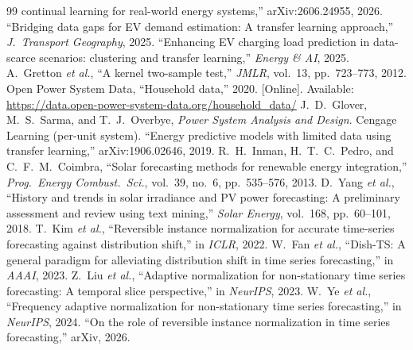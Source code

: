 \documentclass[conference]{IEEEtran}
\begin{document}
\begin{thebibliography}{99}
continual learning for real-world energy systems,'' arXiv:2606.24955, 2026.
 ``Bridging data gaps for EV demand estimation: A
transfer learning approach,'' \emph{J.\ Transport Geography}, 2025.
 ``Enhancing EV charging load prediction in
data-scarce scenarios: clustering and transfer learning,'' \emph{Energy \& AI},
2025.
 A.~Gretton \emph{et al.}, ``A kernel two-sample test,''
\emph{JMLR}, vol.~13, pp.~723--773, 2012.
 Open Power System Data, ``Household data,'' 2020. [Online].
Available: \url{https://data.open-power-system-data.org/household_data/}
 J.~D.~Glover, M.~S.~Sarma, and T.~J.~Overbye, \emph{Power System
Analysis and Design}. Cengage Learning (per-unit system).
 ``Energy predictive models with limited data using transfer
learning,'' arXiv:1906.02646, 2019.
 R.~H.~Inman, H.~T.~C.~Pedro, and C.~F.~M.~Coimbra, ``Solar
forecasting methods for renewable energy integration,'' \emph{Prog.\ Energy
Combust.\ Sci.}, vol.~39, no.~6, pp.~535--576, 2013.
 D.~Yang \emph{et al.}, ``History and trends in solar irradiance
and PV power forecasting: A preliminary assessment and review using text mining,''
\emph{Solar Energy}, vol.~168, pp.~60--101, 2018.
 T.~Kim \emph{et al.}, ``Reversible instance normalization for
accurate time-series forecasting against distribution shift,'' in \emph{ICLR}, 2022.
 W.~Fan \emph{et al.}, ``Dish-TS: A general paradigm for
alleviating distribution shift in time series forecasting,'' in \emph{AAAI}, 2023.
 Z.~Liu \emph{et al.}, ``Adaptive normalization for non-stationary
time series forecasting: A temporal slice perspective,'' in \emph{NeurIPS}, 2023.
 W.~Ye \emph{et al.}, ``Frequency adaptive normalization for
non-stationary time series forecasting,'' in \emph{NeurIPS}, 2024.
 ``On the role of reversible instance normalization in time
series forecasting,'' arXiv, 2026.
\end{thebibliography}
\end{document}
